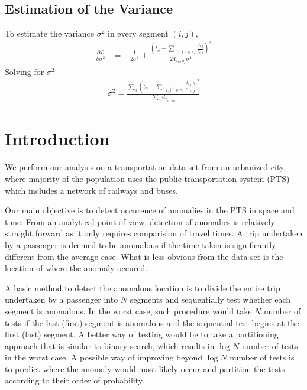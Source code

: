 \documentclass[10pt]{article}
\begin{document}
\subsection{Estimation of the Variance}

To estimate the variance $\sigma^2$ in every segment $(i,j)$, 
\begin{align}
	\frac{\partial \mathcal{L}}{\partial \sigma^2} &= - \frac{1}{ 2 \sigma^2 } + \frac{ \left( t_n - \sum_{ (i,j) \in r_n } \frac{d_{i,j}}{c_{i,j}} \right)^2}{ 2 d_{x_n, y_n} \sigma^4 }
\end{align}
Solving for $\sigma^2$
\begin{align}
	\sigma^2 = \frac{ \sum_n \left( t_n - \sum_{ (i,j) \in r_n } \frac{d_{i,j}}{c_{i,j}} \right)^2}{\sum_n d_{x_n, y_n}}
\end{align}

\section{Introduction}

We perform our analysis on a transportation data set from an urbanized city, where majority of the population uses the public transportation system (PTS) which includes a network of railways and buses. 

Our main objective is to detect occurence of anomalies in the PTS in space and time. From an analytical point of view, detection of anomalies is relatively straight forward as it only requires comparision of travel times. A trip undertaken by a passenger is deemed to be anomalous if the time taken is significantly different from the average case. What is less obvious from the data set is the location of where the anomaly occured.

A basic method to detect the anomalous location is to divide the entire trip undertaken by a passenger into $N$ segments and sequentially test whether each segment is anomalous. In the worst case, such procedure would take $N$ number of tests if the last (first) segment is anomalous and the sequential test begins at the first (last) segment. A better way of testing would be to take a partitioning approach that is similar to binary search, which results in $\log N$ number of tests in the worst case. A possible way of improving beyond $\log N$ number of tests is to predict where the anomaly would most likely occur and partition the tests according to their order of probability.
\end{document}
